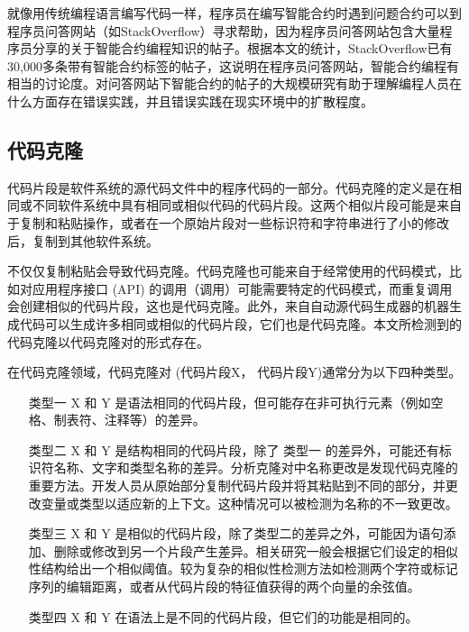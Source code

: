 就像用传统编程语言编写代码一样，程序员在编写智能合约时遇到问题合约可以到程序员问答网站（如StackOverflow）寻求帮助，因为程序员问答网站包含大量程序员分享的关于智能合约编程知识的帖子\cite{ASE61}。根据本文的统计，StackOverflow已有30,000多条带有智能合约标签的帖子，这说明在程序员问答网站，智能合约编程有相当的讨论度。对问答网站下智能合约的帖子的大规模研究有助于理解编程人员在什么方面存在错误实践，并且错误实践在现实环境中的扩散程度。

\subsection{代码克隆}

代码片段是软件系统的源代码文件中的程序代码的一部分。代码克隆的定义是在相同或不同软件系统中具有相同或相似代码的代码片段。这两个相似片段可能是来自于复制和粘贴操作，或者在一个原始片段对一些标识符和字符串进行了小的修改后，复制到其他软件系统。

不仅仅复制粘贴会导致代码克隆。代码克隆也可能来自于经常使用的代码模式，比如对应用程序接口 (API) 的调用（调用）可能需要特定的代码模式，而重复调用会创建相似的代码片段，这也是代码克隆。此外，来自自动源代码生成器的机器生成代码可以生成许多相同或相似的代码片段，它们也是代码克隆。本文所检测到的代码克隆以代码克隆对的形式存在。

在代码克隆领域，代码克隆对 (代码片段X， 代码片段Y)通常分为以下四种类型\cite{cloneIntro}。

\begin{itemize}

    \item[类型一] X 和 Y 是语法相同的代码片段，但可能存在非可执行元素（例如空格、制表符、注释等）的差异。
    
    \item[类型二] X 和 Y 是结构相同的代码片段，除了 类型一 的差异外，可能还有标识符名称、文字和类型名称的差异。分析克隆对中名称更改是发现代码克隆的重要方法。开发人员从原始部分复制代码片段并将其粘贴到不同的部分，并更改变量或类型以适应新的上下文。这种情况可以被检测为名称的不一致更改。
    
    \item[类型三] X 和 Y 是相似的代码片段，除了类型二的差异之外，可能因为语句添加、删除或修改到另一个片段产生差异。相关研究一般会根据它们设定的相似性结构给出一个相似阈值。较为复杂的相似性检测方法如检测两个字符或标记序列的编辑距离，或者从代码片段的特征值获得的两个向量的余弦值。
    
    \item[类型四] X 和 Y 在语法上是不同的代码片段，但它们的功能是相同的。
    
\end{itemize}

